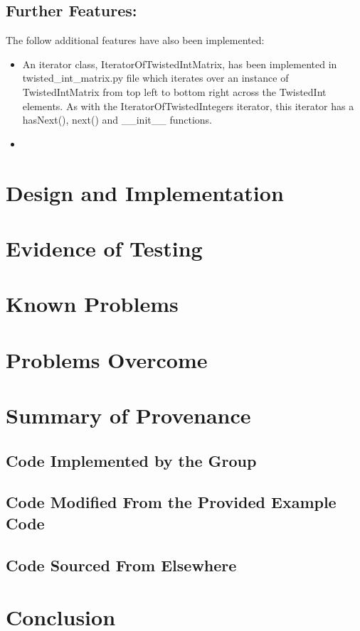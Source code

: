 \documentclass[11]{article}
\begin{document}
	\subsection{Further Features:}
		The follow additional features have also been implemented:
		\begin{itemize}
			\item An iterator class, IteratorOfTwistedIntMatrix, has been implemented in twisted\_int\_matrix.py file which iterates over an instance of TwistedIntMatrix from top left to bottom right across the TwistedInt elements. As with the IteratorOfTwistedIntegers iterator, this iterator has a hasNext(), next() and \_\_init\_\_ functions.
			\item 
		\end{itemize}

	\section{Design and Implementation}

		
	\section{Evidence of Testing}	

		
	\section{Known Problems}

		
	\section{Problems Overcome}

	\section{Summary of Provenance}
			\subsection{Code Implemented by the Group} 

			\subsection{Code Modified From the Provided Example Code}

			\subsection{Code Sourced From Elsewhere}
				
	
\section{Conclusion}
\end{document}
